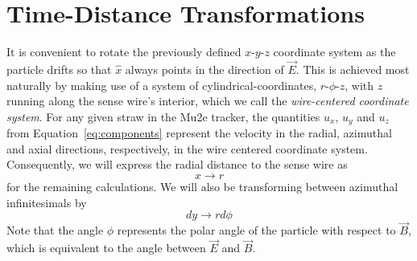 \documentclass[twoside]{article}
\begin{document}
\begin{multicols}{2}
\begin{table}[H]
\begin{tabular}{llr}
\bottomrule
\end{tabular}
\end{table}









\section{Time-Distance Transformations}
It is convenient to rotate the previously defined $x$-$y$-$z$ coordinate system as the particle drifts so that $\hat{x}$ always points in the direction of $\vec{E}$.  This is achieved most naturally by making use of a system of cylindrical-coordinates, $r$-$\phi$-$z$, with $z$ running along the sense wire's interior, which we call the \emph{wire-centered coordinate system}. For any given straw in the Mu2e tracker, the quantities $u_x$, $u_y$ and $u_z$ from Equation~\ref{eq:components} represent the velocity in the radial, azimuthal and axial directions, respectively, in the wire centered coordinate system.  Consequently, we will express the radial distance to the sense wire as
\begin{equation} 
 x \to r
 \end{equation}
 for the remaining calculations. We will also be transforming between azimuthal infinitesimals by
 \begin{equation}
 dy \to r d\phi 
 \end{equation}
 Note that the angle $\phi$ represents the polar angle of the particle with respect to $\vec{B}$, which is equivalent to the angle between $\vec{E}$ and $\vec{B}$. 





\end{multicols}
\end{document}
